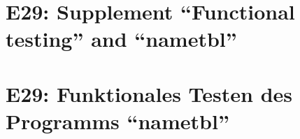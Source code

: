 
\thispagestyle{empty}
\ifenglish
\section*{E29: Supplement ``Functional testing'' and ``nametbl''}

\fi
\ifgerman
\section*{E29: Funktionales Testen des Programms "`nametbl"'}

\fi


